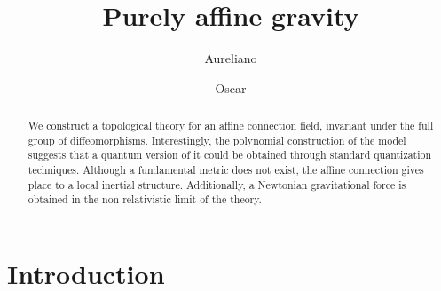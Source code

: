 \documentclass[twocolumn,aps,
  showpacs,showkeys,prd,superscriptaddress]{revtex4-1}
\begin{document}
\title{Purely affine gravity}


\author{Aureliano }

\author{Oscar }

\begin{abstract}
  We construct a topological theory for an affine connection field, invariant under the full group of diffeomorphisms. Interestingly, the polynomial construction of the model suggests that a quantum version of it could be obtained through standard quantization techniques. Although a fundamental metric does not exist, the  affine connection gives place to a local inertial structure. Additionally, a Newtonian gravitational force is obtained in the non-relativistic limit of the theory.
\end{abstract}



\maketitle


\section{Introduction}
\end{document}
